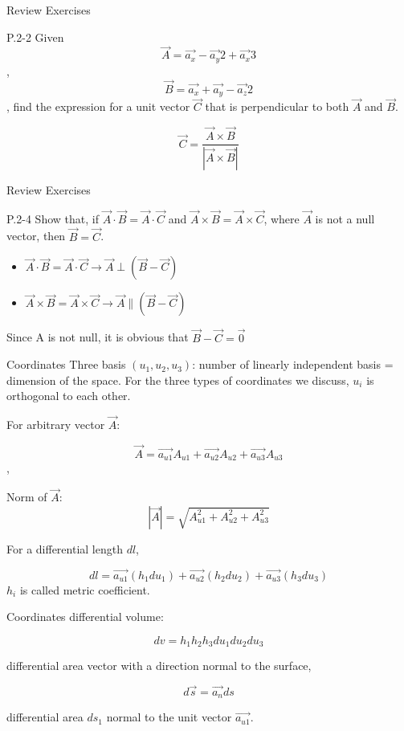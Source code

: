 \documentclass[xcolor={dvipsnames}]{beamer}
\begin{document}
\begin{frame}{Review Exercises}
\begin{block}{P.2-2}
Given 
    $$\vec{A}=\vec{a_x}-\vec{a_y}2+\vec{a_x}3$$, $$\vec{B}=\vec{a_x}+\vec{a_y}-\vec{a_z}2$$, find the expression for a unit vector $\vec{C}$ that is perpendicular to both $\vec{A}$ and $\vec{B}$.
\end{block}
\pause
$$\vec{C}=\frac{\vec{A}\times\vec{B}}{|\vec{A}\times\vec{B}|}$$
\end{frame}
\begin{frame}{Review Exercises}
\begin{block}{P.2-4}
Show that, if $\vec{A}\cdot\vec{B} = \vec{A}\cdot\vec{C}$ and $\vec{A}\times\vec{B} = \vec{A}\times\vec{C}$, where $\vec{A}$ is not a null vector, then $\vec{B}=\vec{C}$.
\end{block}
\pause
\begin{itemize}
	\item $\vec{A}\cdot\vec{B} = \vec{A}\cdot\vec{C}\rightarrow \vec{A}\perp (\vec{B}-\vec{C})$
	\item $\vec{A}\times\vec{B} = \vec{A}\times\vec{C}\rightarrow \vec{A}\parallel (\vec{B}-\vec{C})$
\end{itemize}
Since A is not null, it is obvious that $\vec{B}-\vec{C}=\vec{0}$
\end{frame}
\begin{frame}{Coordinates}
Three basis $(u_1, u_2, u_3)$: number of linearly independent basis = dimension of the space. For the three types of coordinates we discuss, $u_i$ is orthogonal to each other.

For arbitrary vector $\vec{A}$:

$$\vec{A} = \vec{a_{u1}}A_{u1} + \vec{a_{u2}}A_{u2} + \vec{a_{u3}}A_{u3}$$,

Norm of $\vec{A}$:
$$|\vec{A}| = \sqrt{A_{u1}^2 + A_{u2}^2 + A_{u3}^2}$$

For a differential length $dl$, 

$$dl = \vec{a_{u1}}(h_1du_1) + \vec{a_{u2}}(h_2du_2) + \vec{a_{u3}}(h_3du_3)$$ $h_i$ is called metric coefficient.

\end{frame}
\begin{frame}{Coordinates}
differential volume:

$$dv = h_1h_2h_3du_1du_2du_3$$

differential area vector with a direction normal to the surface,

$$d\vec{s} = \vec{a_n}ds$$

differential area $ds_1$ normal to the unit vector $\vec{a_{u1}}$.
\end{frame}
\end{document}
